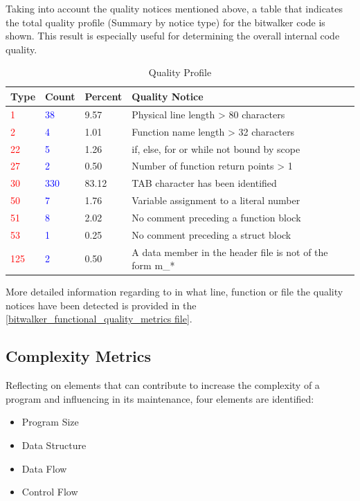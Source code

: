 Taking into account the quality notices mentioned above, a table that indicates the total quality profile (Summary by notice type) for the bitwalker code is shown. This result is especially useful for determining the overall internal code quality.
           
\begin{longtable}{||p{}|p{}|p{}|p{}||}
  \caption{Quality Profile}\\
    \hline\hline
    \textbf{Type} & \textbf{Count} & \textbf{Percent} & \textbf{Quality Notice} \\
    \hline\hline
    \endhead
    \hline\hline
    \endfoot
    \textcolor{red}{1} & \textcolor{blue}{38}
& 9.57
& Physical line length > 80 characters
    \\
    \hline
    \textcolor{red}{2} & \textcolor{blue}{4}
& 1.01
& Function name length > 32 characters
    \\
    \hline
    \textcolor{red}{22} & \textcolor{blue}{5}
& 1.26
& if, else, for or while not bound by scope
    \\
    \hline
    \textcolor{red}{27} & \textcolor{blue}{2}
& 0.50
& Number of function return points > 1
    \\
    \hline
    \textcolor{red}{30} & \textcolor{blue}{330}
& 83.12
& TAB character has been identified
    \\
    \hline
    \textcolor{red}{50} & \textcolor{blue}{7}
& 1.76
& Variable assignment to a literal number
    \\
    \hline
    \textcolor{red}{51} & \textcolor{blue}{8}
& 2.02
& No comment preceding a function block
    \\
    \hline
    \textcolor{red}{53} & \textcolor{blue}{1}
& 0.25
& No comment preceding a struct block
    \\
    \hline
    \textcolor{red}{125} & \textcolor{blue}{2}
& 0.50
& A data member in the header file is not of the form m\_*
    \\
    \hline
\end{longtable}

More detailed information regarding to in what line, function or file the quality notices have been detected is provided in the \href{https://github.com/openETCS/validation/blob/master/VnVUserStories/VnVUserStorySQS/04-Results/bitwalker_functional_quality_metrics.htm}{[bitwalker\_functional\_quality\_metrics file]}. 

\subsection{Complexity Metrics}
Reflecting on elements that can contribute to increase the complexity of a program and influencing in its maintenance, four elements are identified:
\begin{itemize}
\item Program Size
\item Data Structure
\item Data Flow
\item Control Flow
\end{itemize}

